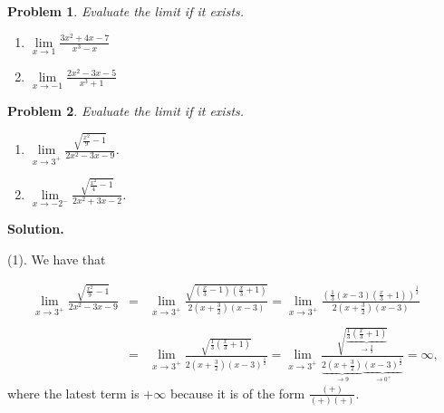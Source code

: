 \documentclass{article}
\newtheorem{problem}{Problem}
\begin{document}
\begin{comment}\textbf{Solution.} 

\noindent (1) Set $\cos x=u$. Then 
\[
2\cos^2 x- (1+\sqrt{2})\cos x+\frac{\sqrt 2}2=0 
\] 
becomes 
\[2u^2-(1+\sqrt{2})u+\frac{\sqrt{2}}{2}=0.
\] 
This is a quadratic equation in $u$ and therefore has solutions
\[
\begin{array}{rcl}
u_1, u_2&=& \displaystyle \frac{ 1+\sqrt{2}\pm\sqrt{ (1+\sqrt{2})^2-4 \sqrt{2} } }4\\
&=&\frac{1+\sqrt{2}\pm\sqrt{1-2\sqrt{2}+2} }4\\
&=&\frac{1+\sqrt{2}\pm \sqrt{(1-\sqrt{2})^2}}4\\
&=&\frac{1+\sqrt{2}\pm (1-\sqrt{2}) }4=\doublebrace{\frac{1}2 }{ \mathrm{or}} {\frac{\sqrt{2}}{2}}{}
\end{array}
\]
Therefore $u=\cos x= \frac12$ or $u=\cos x=\frac{\sqrt{2}}2$, and, as $x$ is in the interval $[0,2\pi]$, we get $x=\frac{\pi}{3}, \frac{5\pi}{3}$ (for $\cos x=\frac12$) or $x=\frac{\pi }4 ,\frac{7\pi}4$ (for $\cos x=\frac{\sqrt{2}}{2}$).
\end{comment}
\begin{problem}
Evaluate the limit if it exists.
\begin{enumerate}
\item $\lim\limits_{x\to 1} \frac{3x^2+4x-7}{x^3-x}$ 
\item $\lim\limits_{x\to -1} \frac{2x^2-3x-5}{x^3+1}$ 
\end{enumerate}
\end{problem}

\begin{problem}
Evaluate the limit if it exists.
\begin{enumerate}
\item $\lim\limits_{x\to 3^+} \frac{\sqrt{\frac{x^2}{9}-1 }}{2x^2 -3x-9 }$. 
\item $\lim\limits_{x\to -2^-} \frac{\sqrt{\frac{x^2}{4}-1 }}{2x^2 +3x-2 }$. 
\end{enumerate}
\end{problem}
\textbf{Solution.}  
 
\noindent (1). We have that 

\[
\begin{array}{rcl}
\lim_{x\to 3^+}\frac{\sqrt{\frac{x^2}9-1} }{2x^2-3x-9}&=& \lim_{x\to 3^+} \frac{\sqrt{(\frac{x}3-1)(\frac{x}3+1)} }{2(x+\frac{3}2)(x-3)}= \lim_{x\to 3^+}
\frac{\left(\frac{1}3(x-3)(\frac{x}3+1)\right)^{\frac{1}2}}{2(x+\frac{3}2)(x-3)} \\~\\
&=& \lim_{x\to 3^+} \frac{\sqrt{\frac{1}3\left(\frac{x}3+1\right)} }{2\left(x+\frac{3}2\right)(x-3)^{\frac12}}= \lim_{x\to 3^+} \frac{\sqrt{\underbrace{ \frac{1}3\left(\frac{x}3+1\right)}_{\to\frac23 }} }{\underbrace{2\left(x+\frac{3}2\right)}_{\to 9}\underbrace{(x-3)^{\frac12}}_{\to 0^+}}=\infty,
\end{array}
\]
where the latest term is $+\infty$ because it is of the form $\frac{(+)}{(+)(+)}$.
\end{document}
